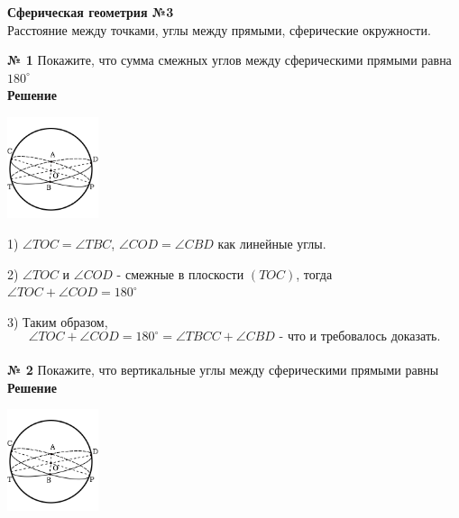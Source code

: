 


    \begin{center}
        \textbf{Сферическая геометрия №3}\\
        Расстояние между точками, углы между прямыми, сферические окружности.
    \end{center}

    \textbf{№ 1}
    Покажите, что сумма смежных углов между сферическими прямыми равна $180^\circ$\\

    \textbf{Решение}\\

    \begin{center}
        \includegraphics[width=0.2\textwidth]{images/img4}\\
    \end{center}

    1) $\angle TOC = \angle TBC$, $\angle COD = \angle CBD$ как линейные углы.

    2) $\angle TOC$ и $\angle COD$ - смежные в плоскости $(TOC)$, тогда $\angle TOC + \angle COD = 180^{\circ}$

    3) Таким образом,
    \[
        \angle TOC + \angle COD = 180^{\circ} = \angle TBCC + \angle CBD \text{ - что и требовалось доказать.}
    \]\\


    \textbf{№ 2}
    Покажите, что вертикальные углы между сферическими прямыми равны\\

    \textbf{Решение}\\

    \begin{center}
        \includegraphics[width=0.2\textwidth]{images/img5}\\
    \end{center}

